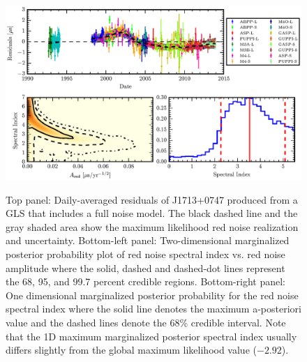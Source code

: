 \documentclass[iop,apj,tighten]{emulateapj}
\begin{document}
\begin{figure}
\includegraphics[scale=1.0]{fig3.eps} \\ 
\caption{\label{fig:res} Top panel: Daily-averaged residuals of J1713+0747 produced from a GLS that includes a 
full noise model. The black dashed line and the gray shaded area show the maximum likelihood red noise
realization and uncertainty. Bottom-left panel: Two-dimensional marginalized posterior probability plot of red
noise spectral index vs. red noise amplitude where the solid, dashed and
dashed-dot lines represent the 68, 95, and 99.7 percent credible regions.
Bottom-right panel: One dimensional marginalized posterior probability for the
red noise spectral index where the solid line denotes the maximum a-posteriori
value and the dashed lines denote the 68\% credible interval. Note that the
1D maximum marginalized posterior spectral index usually differs slightly from the
global maximum likelihood value ($-2.92$).}
\end{figure} 
\end{document}
